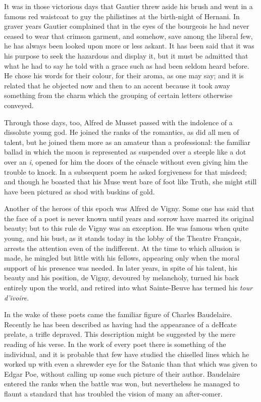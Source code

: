 \documentclass[]{book}
\begin{document}
It was in those victorious days that Gautier threw aside his brush and
went in a famous red waistcoat to guy the philistines at the birth-night
of Hernani. In graver years Gautier complained that in the eyes of the
bourgeois he had never ceased to wear that crimson garment, and somehow,
save among the liberal few, he has always been looked upon more or less
askant. It has been said that it was his purpose to seek the hazardous
and display it, but it must be admitted that what he had to say he told
with a grace such as had been seldom heard before. He chose his words
for their colour, for their aroma, as one may say; and it is related
that he objected now and then to an accent because it took away
something from the charm which the grouping of certain letters otherwise
conveyed.

Through those days, too, Alfred de Musset passed with the indolence of a
dissolute young god. He joined the ranks of the romantics, as did all
men of talent, but he joined them more as an amateur than a
professional: the familiar ballad in which the moon is represented as
suspended over a steeple like a dot over an \emph{i}, opened for him the
doors of the cénacle without even giving him the trouble to knock. In a
subsequent poem he asked forgiveness for that misdeed; and though he
boasted that his Muse went bare of foot like Truth, she might still have
been pictured as shod with buskins of gold.

Another of the heroes of this epoch was Alfred de Vigny. Some one has
said that the face of a poet is never known until years and sorrow have
marred its original beauty; but to this rule de Vigny was an exception.
He was famous when quite young, and his bust, as it stands today in the
lobby of the Theatre Français, arrests the attention even of the
indifferent. At the time to which allusion is made, he mingled but
little with his fellows, appearing only when the moral support of his
presence was needed. In later years, in spite of his talent, his beauty
and his position, de Vigny, devoured by melancholy, turned his back
entirely upon the world, and retired into what Sainte-Beuve has termed
his \emph{tour d'ivoire}.

In the wake of these poets came the familiar figure of Charles
Baudelaire. Recently he has been described as having had the appearance
of a deHcate prelate, a trifle depraved. This description might be
suggested by the mere reading of his verse. In the work of every poet
there is something of the individual, and it is probable that few have
studied the chiselled lines which he worked up with even a shrewder eye
for the Satanic than that which was given to Edgar Poe, without calling
up some such picture of their author. Baudelaire entered the ranks when
the battle was won, but nevertheless he managed to flaunt a standard
that has troubled the vision of many an after-comer.
\end{document}
